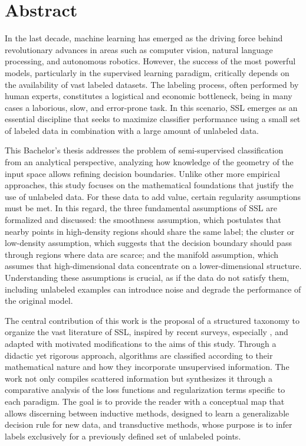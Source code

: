 \chapter*{Abstract}
\makeatletter{}\makeatother
{}


In the last decade, machine learning has emerged as the driving force behind revolutionary advances in areas such as computer vision, natural language processing, and autonomous robotics. However, the success of the most powerful models, particularly in the supervised learning paradigm, critically depends on the availability of vast labeled datasets. The labeling process, often performed by human experts, constitutes a logistical and economic bottleneck, being in many cases a laborious, slow, and error-prone task. In this scenario, \acrfull{SSL} emerges as an essential discipline that seeks to maximize classifier performance using a small set of labeled data in combination with a large amount of unlabeled data.

This Bachelor's thesis addresses the problem of semi-supervised classification from an analytical perspective, analyzing how knowledge of the geometry of the input space allows refining decision boundaries. Unlike other more empirical approaches, this study focuses on the mathematical foundations that justify the use of unlabeled data. For these data to add value, certain regularity assumptions must be met. In this regard, the three fundamental assumptions of \acrshort{SSL} are formalized and discussed: the smoothness assumption, which postulates that nearby points in high-density regions should share the same label; the cluster or low-density assumption, which suggests that the decision boundary should pass through regions where data are scarce; and the manifold assumption, which assumes that high-dimensional data concentrate on a lower-dimensional structure. Understanding these assumptions is crucial, as if the data do not satisfy them, including unlabeled examples can introduce noise and degrade the performance of the original model.

The central contribution of this work is the proposal of a structured taxonomy to organize the vast literature of \acrshort{SSL}, inspired by recent surveys, especially \citet{van2020survey}, and adapted with motivated modifications to the aims of this study. Through a didactic yet rigorous approach, algorithms are classified according to their mathematical nature and how they incorporate unsupervised information. The work not only compiles scattered information but synthesizes it through a comparative analysis of the loss functions and regularization terms specific to each paradigm. The goal is to provide the reader with a conceptual map that allows discerning between inductive methods, designed to learn a generalizable decision rule for new data, and transductive methods, whose purpose is to infer labels exclusively for a previously defined set of unlabeled points.

